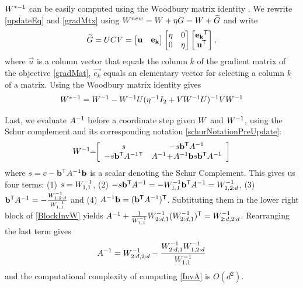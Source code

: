 \documentclass{article}
\begin{document}
${W}^{*-1}$ can be easily computed using the Woodbury matrix
identity \cite{woodbury1950inverting}. We rewrite  \eqref{updateEq} and \eqref{gradMtx} using ${{W^{new}}} = {W} + \eta G = {W}+{\widetilde{G}}$
and write
\begin{equation}
  {\widetilde{G}} = {U}{C}{V} = \left[ \begin{matrix}
      \mathbf{u} & \mathbf{e_k} \end{matrix} \right] \left[ \begin{matrix}
      \eta & 0 \\ 0 & \eta \end{matrix} \right] \left[ \begin{matrix}
      \mathbf{e_k}{}^\mathsf{T} \\ \mathbf{u}{}^\mathsf{T} \end{matrix} \right],
  \label{gradMtxWDB}
\end{equation}
where $\vec{u}$ is a column vector that equals the column $k$ of the gradient matrix of the objective \eqref{gradMat},
$\vec{e_k}$ equals an elementary vector for selecting a column $k$ of
a matrix. 
Using the Woodbury matrix identity gives 
\begin{equation}
    \begin{array}{lcl}
    {W}^{*-1} = 
    {W}^{-1} - {W}^{-1} {U} (\eta^{-1} I_2 + {V}     {W}^{-1} {U})^{-1} {V} {W}^{-1}
    \end{array}
    \label{InvWwdb}
\end{equation}

Last, we evaluate $A^{-1}$ before a coordinate step given ${W}$
and ${W}^{-1}$, using the Schur complement and its corresponding
notation \eqref{schurNotationPreUpdate}:
\begin{equation}
\begin{array}{l}
 {W}^{-1} \!\!=\!\! 
 \left[ \begin{array}{cc} s & -s \mathbf{b}{}^\mathsf{T} A^{-1} \\ -s \mathbf{b}{}^\mathsf{T} A^{-1}{}^\mathsf{T} &  A^{-1} \!+ \!A^{-1} \mathbf{b} s \mathbf{b}{}^\mathsf{T} A^{-1}  \end{array}  \right]
\end{array}
\label{BlockInvW}
\end{equation}
where $s= c-\mathbf{b}{}^\mathsf{T} A^{-1} \mathbf{b}$ is a scalar denoting the Schur Complement. This gives us four terms: (1) $s = {W}^{-1}_{1,1}$, (2)
$  -s \mathbf{b}{}^\mathsf{T} A^{-1} = -{W}^{-1}_{1,1} \mathbf{b}{}^\mathsf{T} A^{-1} = {W}^{-1}_{1,2:d}$, (3) $\mathbf{b}{}^\mathsf{T} A^{-1} = -\frac{{W}^{-1}_{1,2:d}}{{W}^{-1}_{1,1} }$ and (4) $A^{-1}\mathbf{b} = (\mathbf{b}{}^\mathsf{T} A^{-1}){}^\mathsf{T}$. Subtituting them in the lower right block of \eqref{BlockInvW} yields $A^{-1} + \frac{1}{{W}^{-1}_{1,1} } {W}^{-1}_{2:d,1} ({W}^{-1}_{2:d,1}){}^\mathsf{T} = {W}^{-1}_{2:d,2:d}$. Rearranging the last term gives
\begin{equation}
  A^{-1} = {W}^{-1}_{2:d,2:d}- \frac{{W}^{-1}_{2:d,1} {W}^{-1}_{1,2:d}}{{W}^{-1}_{1,1}}
  \label{InvA}
\end{equation}
and the computational complexity of computing \eqref{InvA} is $O(d^2)$.
\end{document}
